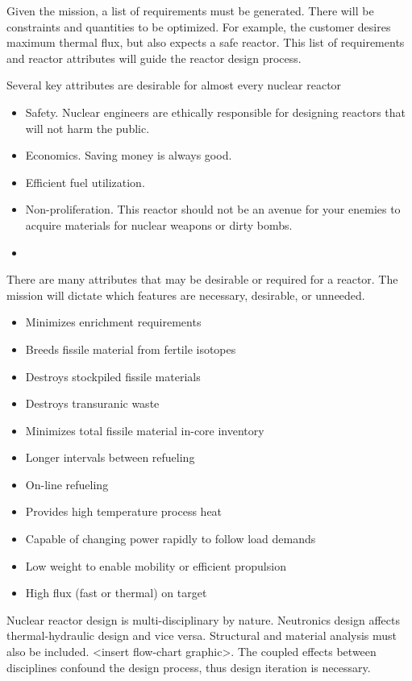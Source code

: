 \documentclass[]{article}
\begin{document}
Given the mission, a list of requirements must be generated. There will be constraints and quantities to be optimized. For example, the customer desires maximum thermal flux, but also expects a safe reactor. This list of requirements and reactor attributes will guide the reactor design process.

Several key attributes are desirable for almost every nuclear reactor
\begin{itemize}
  \item Safety. Nuclear engineers are ethically responsible for designing reactors that will not harm the public.
  \item Economics. Saving money is always good.
  \item Efficient fuel utilization. 
  \item Non-proliferation. This reactor should not be an avenue for your enemies to acquire materials for nuclear weapons or dirty bombs.
  \item
\end{itemize}
There are many attributes that may be desirable or required for a reactor. The mission will dictate which features are necessary, desirable, or unneeded.
\begin{itemize}
  \item Minimizes enrichment requirements
  \item Breeds fissile material from fertile isotopes
  \item Destroys stockpiled fissile materials
  \item Destroys transuranic waste
  \item Minimizes total fissile material in-core inventory
  \item Longer intervals between refueling
  \item On-line refueling
  \item Provides high temperature process heat
  \item Capable of changing power rapidly to follow load demands
  \item Low weight to enable mobility or efficient propulsion
  \item High flux (fast or thermal) on target
\end{itemize}

Nuclear reactor design is multi-disciplinary by nature. Neutronics design affects thermal-hydraulic design and vice versa. Structural and material analysis must also be included. <insert flow-chart graphic>. The coupled effects between disciplines confound the design process, thus design iteration is necessary.
\end{document}

